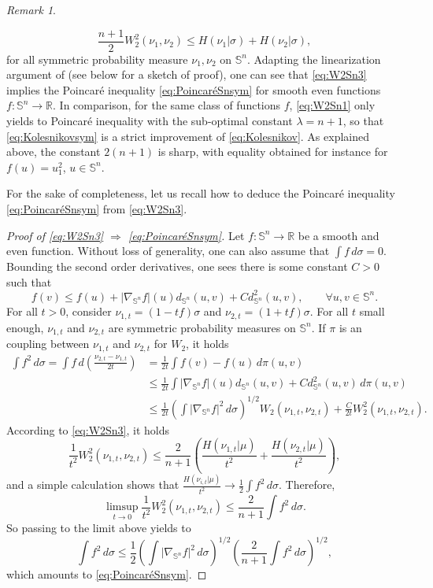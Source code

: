 \documentclass[10pt]{amsart}
\theoremstyle{definition}
\theoremstyle{remark}
\newtheorem{rem}[thm]{Remark}
\newcommand{\R}{\mathbb{R}}
\newcommand{\Sd}{\mathbb{S}}
\begin{document}
\begin{rem}
\begin{itemize}
\begin{equation}\label{eq:W2Sn3}
\frac{n+1}{2} W_2^2(\nu_1,\nu_2) \leq H(\nu_1|\sigma)+H(\nu_2|\sigma),
\end{equation}
for all symmetric probability measure $\nu_1,\nu_2$ on $\Sd^n$. Adapting the linearization argument of \cite{OV00} (see below for a sketch of proof), one can see that \eqref{eq:W2Sn3} implies the Poincaré inequality \eqref{eq:PoincaréSnsym} for smooth even functions  $f:\Sd^n\to \R$. In comparison, for the same class of functions $f$, \eqref{eq:W2Sn1} only yields to Poincar\'e inequality with the sub-optimal constant $\lambda = n+1$, so that \eqref{eq:Kolesnikovsym} is a strict improvement of \eqref{eq:Kolesnikov}. As explained above, the constant $2(n+1)$ is sharp, with equality obtained for instance for $f(u) = u_1^2$, $u\in \Sd^n$.
\end{itemize}
\end{rem}

For the sake of completeness, let us recall how to deduce the Poincaré inequality \eqref{eq:PoincaréSnsym} from \eqref{eq:W2Sn3}.
\begin{proof}[Proof of \eqref{eq:W2Sn3} $\Rightarrow$ \eqref{eq:PoincaréSnsym}]
Let $f:\Sd^n \to \R$ be a smooth and even function. Without loss of generality, one can also assume that $\int f\,d\sigma = 0$. Bounding the second order derivatives, one sees there is some constant $C>0$ such that
\[
f(v) \leq f(u) + |\nabla_{\Sd^n}f|(u) d_{\Sd^n}(u,v) + C d^2_{\Sd^n}(u,v),\qquad \forall u,v \in \Sd^n.
\]
For all $t>0$, consider $\nu_{1,t} = (1-tf)\sigma$ and $\nu_{2,t} = (1+tf)\sigma$. For all $t$ small enough, $\nu_{1,t}$ and $\nu_{2,t}$ are symmetric probability measures on $\Sd^n$.
If $\pi$ is an coupling between $\nu_{1,t}$ and $\nu_{2,t}$ for $W_2$, it holds
\begin{align*}
\int f^2\,d\sigma = \int f\,d\left(\frac{\nu_{2,t}-\nu_{1,t}}{2t}\right) & = \frac{1}{2t}\int f(v)-f(u)\,d\pi(u,v)\\
&\leq \frac{1}{2t}\int |\nabla_{\Sd^n}f|(u) d_{\Sd^n}(u,v) + C d^2_{\Sd^n}(u,v)\,d\pi(u,v)\\
& \leq \frac{1}{2t}\left(\int |\nabla_{\Sd^n}f|^2\,d\sigma\right)^{1/2} W_2(\nu_{1,t},\nu_{2,t}) + \frac{C}{2t}W_2^2(\nu_{1,t},\nu_{2,t}).
\end{align*}
According to \eqref{eq:W2Sn3}, it holds 
\[
\frac{1}{t^2}W_2^2(\nu_{1,t},\nu_{2,t}) \leq \frac{2}{n+1} \left(\frac{H(\nu_{1,t} | \mu)}{t^2} + \frac{H(\nu_{2,t} | \mu)}{t^2}\right),
\]
and a simple calculation shows that $\frac{H(\nu_{i,t} | \mu)}{t^2} \to \frac{1}{2} \int f^2\,d\sigma$. 
Therefore,
\[
\limsup_{t\to 0} \frac{1}{t^2}W_2^2(\nu_{1,t},\nu_{2,t}) \leq \frac{2}{n+1} \int f^2\,d\sigma.
\]
So passing to the limit above yields to
\[
\int f^2\,d\sigma \leq \frac{1}{2}\left(\int |\nabla_{\Sd^n}f|^2\,d\sigma\right)^{1/2}\left(\frac{2}{n+1}\int f^2\,d\sigma\right)^{1/2},
\]
which amounts to \eqref{eq:PoincaréSnsym}.
\end{proof}
\end{document}
